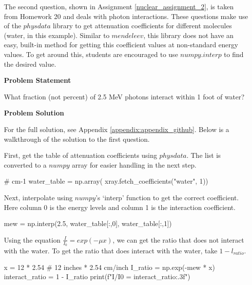 The second question, shown in Assignment \ref{nuclear_assignment_2}, is taken 
from Homework 20 and deals with photon interactions. 
These questions make use of the $physdata$ library to get attenuation coefficients for different
molecules (water, in this example). Similar to $mendeleev$, this library does not have an easy, 
built-in method for getting this coefficient values at non-standard energy values. To get around
this, students are encouraged to use $numpy.interp$ to find the desired value.

\label{nuclear_assignment_2}

\begin{tcolorbox}[breakable, enhanced jigsaw, title=NE 495: Assignment \ref{nuclear_assignment_2}, 
    colframe=ksu-purple, colback=ksu-gray]

    \textbf{Problem Statement}
    \parindent15pt

    What fraction (not percent) of 2.5 MeV photons interact within 1 foot of water?

    \tcblower
    \textbf{Problem Solution}
    \parindent15pt
    
    For the full solution, see Appendix \ref{appendix:appendix_github}. Below is a walkthrough
    of the solution to the first question.

    First, get the table of attenuation coefficients using $physdata$. The list is converted to 
    a $numpy$ array for easier handling in the next step.

\begin{python}
# cm-1
water_table = np.array(
    xray.fetch_coefficients("water", 1))
\end{python}

Next, interpolate using $numpy$'s `interp' function to get the correct coefficient. Here column 
0 is the energy levels and column 1 is the interaction coefficient.

\begin{python}
mew = np.interp(2.5, water_table[:,0], water_table[:,1])
\end{python}

Using the equation $ \frac{I}{I_0} = exp(-\mu x) $, we can get the ratio that does not 
interact with the water. To get the ratio that does interact with the water, take 
$ 1 - l_{ratio} $.

\begin{python}
x = 12 * 2.54 # 12 inches * 2.54 cm/inch
I_ratio = np.exp(-mew * x)
interact_ratio = 1 - I_ratio
print(f"I/I0 = {interact_ratio:.3f}")
\end{python}

\end{tcolorbox}

